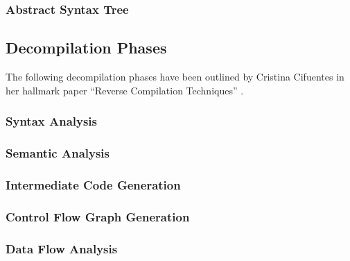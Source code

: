 \documentclass[12pt, a4paper]{article}
\begin{document}
\subsubsection{Abstract Syntax Tree}


\subsection{Decompilation Phases}


The following decompilation phases have been outlined by Cristina Cifuentes in
her hallmark paper ``Reverse Compilation Techniques'' \cite{rev_comp}.


\subsubsection{Syntax Analysis}


\subsubsection{Semantic Analysis}


\subsubsection{Intermediate Code Generation}


\subsubsection{Control Flow Graph Generation}


\subsubsection{Data Flow Analysis}
\end{document}
